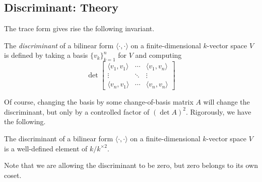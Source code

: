 \documentclass[../notes.tex]{subfiles}
\begin{document}
\subsection{Discriminant: Theory}
The trace form gives rise the following invariant.
\begin{definition}[Discriminant]
	The \textit{discriminant} of a bilinear form $\langle\cdot,\cdot\rangle$ on a finite-dimensional $k$-vector space $V$ is defined by taking a basis $\{v_k\}_{k=1}^n$ for $V$ and computing
	\[\det\begin{bmatrix}
		\langle v_1,v_1\rangle & \cdots & \langle v_1,v_n\rangle \\
		\vdots & \ddots & \vdots \\
		\langle v_n,v_1\rangle & \cdots & \langle v_n,v_n\rangle
	\end{bmatrix}\]
\end{definition}
Of course, changing the basis by some change-of-basis matrix $A$ will change the discriminant, but only by a controlled factor of $(\det A)^2.$ Rigorously, we have the following.
\begin{lemma}
	The discriminant of a bilinear form $\langle\cdot,\cdot\rangle$ on a finite-dimensional $k$-vector space $V$ is a well-defined element of $k/k^{\times2}.$
\end{lemma}
Note that we are allowing the discriminant to be zero, but zero belongs to its own coset.
\end{document}
